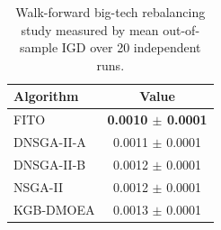 \begin{table}[!t]
\centering
\caption{Walk-forward big-tech rebalancing study measured by mean out-of-sample IGD over 20 independent runs.}
\label{tab:portfolio-migd}
\begin{tabular}{lc}
\toprule
Algorithm & Value \\
\midrule
FITO & \textbf{0.0010 $\pm$ 0.0001} \\
DNSGA-II-A & 0.0011 $\pm$ 0.0001 \\
DNSGA-II-B & 0.0012 $\pm$ 0.0001 \\
NSGA-II & 0.0012 $\pm$ 0.0001 \\
KGB-DMOEA & 0.0013 $\pm$ 0.0001 \\
\bottomrule
\end{tabular}
\end{table}
